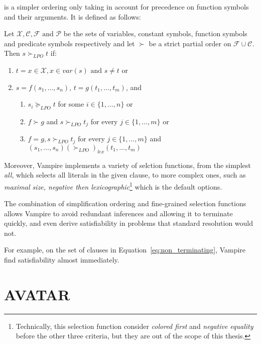  is a simpler ordering only taking in account for precedence on function symbols and their arguments.
It is defined as follows:
\begin{definition}
  Let \(\mathcal{X},\mathcal{C},\mathcal{F} \text{ and } \mathcal{P}\) be the sets of variables, constant symbols, function symbols and predicate symbols respectively and let \(\succ\) be a strict partial order on \(\mathcal{F} \cup \mathcal{C}\).
  Then \(s\succ_{LPO} t\) if:
  \begin{enumerate}
    \item \(t = x \in \mathcal{X}, x \in var(s) \text{ and } s \neq t\) or
    \item \(s = f(s_1,\ldots,s_n)\), \(t = g(t_1,\ldots,t_m)\), and
          \begin{enumerate}
            \item \(s_i \succeq_{LPO} t\) for some \(i \in \{1,\ldots,n\}\) or
            \item \(f \succ g\) and \(s \succ_{LPO} t_j\) for every \(j \in \{1,\ldots,m\}\) or
            \item \(f = g, s \succ_{LPO} t_j\) for every \(j \in \{1,\ldots,m\}\) and \((s_1, \ldots, s_n) {(\succ_{LPO})}_{lex} (t_1, \ldots, t_m)\)
          \end{enumerate}
  \end{enumerate}
\end{definition}

Moreover, Vampire implements a variety of selction functions, from the simplest \emph{all}, which selects all literals in the given clause, to more complex ones, such as \emph{maximal size, negative then lexicographic}\footnote{
  Technically, this selection function consider \emph{colored first} and \emph{negative equality} before the other three criteria, but they are out of the scope of this thesis.
} which is the default options.

The combination of simplification ordering and fine-grained selection functions allows Vampire to avoid redundant inferences and allowing it to terminate quickly, and even derive satisfiability in problems that standard resolution would not.

For example, on the set of clauses in Equation~\ref{eq:non_terminating}, Vampire find satisfiability almost immediately.

\section{AVATAR}\label{sec:avatar-architecture}

